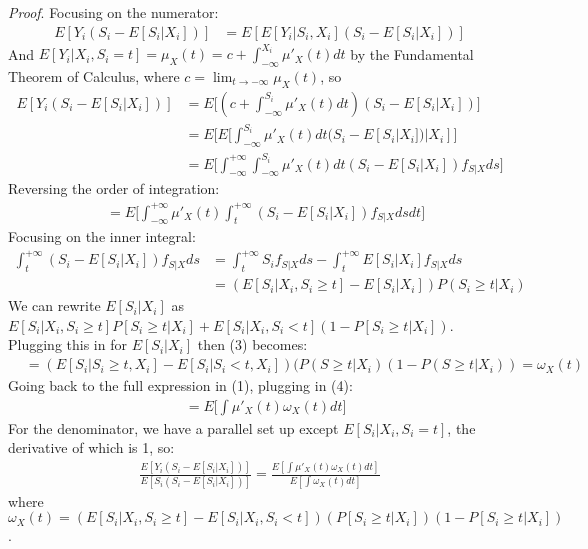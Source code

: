 \documentclass[11pt]{article}
\begin{document}
\begin{enumerate}[a)]
	\textit{Proof}. Focusing on the numerator:
	\begin{align*}
		E[Y_i(S_i - E[S_i|X_i])] &= E[E[Y_i|S_i, X_i] (S_i - E[S_i|X_i])]
	\end{align*}
	And $E[Y_i|X_i, S_i=t] = \mu_{X}(t) = c + \int^{X_i}_{-\infty} \mu'_X(t) dt$  by the Fundamental Theorem of Calculus, where $c = \lim_{t \rightarrow -\infty} \mu_X(t)$, so
	\begin{align*}
		E[Y_i(S_i - E[S_i|X_i])] &= E\bigg[ (c + \int^{S_i}_{-\infty} \mu'_X(t) dt)  (S_i - E[S_i|X_i]) \bigg] \\
		&= E\bigg[ E[\int^{S_i}_{-\infty} \mu'_X(t) dt (S_i - E[S_i|X_i]) | X_i] \bigg]\\
		&= E\bigg[ \int^{+\infty}_{-\infty}\int^{S_i}_{-\infty} \mu'_X(t) dt (S_i - E[S_i|X_i]) f_{S|X}ds \bigg]
	\end{align*}
	Reversing the order of integration:
	\begin{align}
		&= E \bigg[ \int^{+\infty}_{-\infty} \mu'_X(t) \int^{+ \infty}_{t} ( S_i - E[S_i|X_i]) f_{S|X} ds dt \bigg]
	\end{align}
	Focusing on the inner integral:
	\begin{align}
		\int^{+ \infty}_{t} ( S_i - E[S_i|X_i]) f_{S|X} ds &= \int^{+ \infty}_{t} S_i f_{S|X} ds - \int^{+ \infty}_{t} E[S_i|X_i] f_{S|X} ds \\
		&=(E[S_i |  X_i, S_i \geq t] - E[S_i | X_i] ) P(S_i \geq t | X_i) 
	\end{align}		
	We can rewrite $E[S_i|X_i]$ as $E[S_i|X_i, S_i \geq t]P[S_i\geq t|X_i] + E[S_i|X_i, S_i < t](1 - P[S_i\geq t|X_i])$. Plugging this in for $E[S_i | X_i]$ then (3) becomes:
	\begin{align}
		&=(E[S_i | S_i \geq t, X_i ] - E[S_i | S_i < t, X_i ] )(P(S \geq t | X_i)( 1 - P(S \geq t | X_i)) = \omega_X(t)
	\end{align}
	Going back to the full expression in (1), plugging in (4):
	\begin{align*}
		&= E \bigg[ \int \mu'_X(t) \omega_X(t) dt \bigg]
	\end{align*}
	For the denominator, we have a parallel set up except $E[S_i| X_i, S_i=t]$, the derivative of which is 1, so: 
	\begin{align*}
		\frac{E[Y_i(S_i - E[S_i|X_i])]}{E[S_i(S_i - E[S_i|X_i])]} = \frac{E [\int \mu'_X(t) 		\omega_X(t) dt]}{E[\int \omega_X(t) dt]}
	\end{align*}
	where $\omega_X(t) = ( E[S_i | X_i, S_i \geq t ] -E[S_i | X_i, S_i < t])(P[S_i\geq t| X_i])(1 -  P[S_i\geq t| X_i])$.

\end{enumerate}
\end{document}

